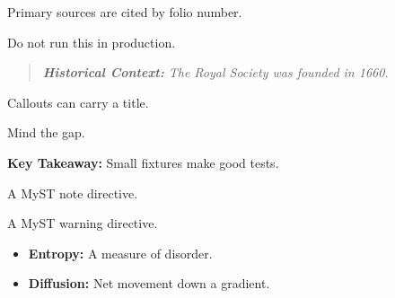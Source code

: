 
\begin{notebox}\sloppy\noindent{\sansbold\fontsize{8.5pt}{10.5pt}\selectfont\textcolor{noteaccent}{NOTE}}\par\smallskip\noindent Primary sources are cited by folio number.
\end{notebox}

\begin{importantbox}\sloppy\noindent{\sansbold\fontsize{8.5pt}{10.5pt}\selectfont\textcolor{impaccent}{WARNING}}\par\smallskip\noindent Do not run this in production.
\end{importantbox}

\begin{quote}{\itshape\color{diaggray}\textbf{Historical Context:} The Royal Society was founded in 1660.}
\end{quote}

\begin{notebox}\sloppy\noindent{\sansbold\fontsize{8.5pt}{10.5pt}\selectfont\textcolor{noteaccent}{DEEP DIVE: Remember}}\par\smallskip\noindent Callouts can carry a title.
\end{notebox}

\begin{importantbox}\sloppy\noindent{\sansbold\fontsize{8.5pt}{10.5pt}\selectfont\textcolor{impaccent}{WARNING: Warning}}\par\smallskip\noindent Mind the gap.
\end{importantbox}

\begin{tipbox}\sloppy{}\end{tipbox}

\textbf{Key Takeaway:} Small fixtures make good tests.

\begin{notebox}\sloppy\noindent{\sansbold\fontsize{8.5pt}{10.5pt}\selectfont\textcolor{noteaccent}{NOTE}}\par\smallskip\noindent A MyST note directive.
\end{notebox}

\begin{importantbox}\sloppy\noindent{\sansbold\fontsize{8.5pt}{10.5pt}\selectfont\textcolor{impaccent}{WARNING}}\par\smallskip\noindent A MyST warning directive.
\end{importantbox}

\begin{itemize}
  \item \textbf{Entropy:} A measure of disorder.
  \item \textbf{Diffusion:} Net movement down a gradient.
\end{itemize}
